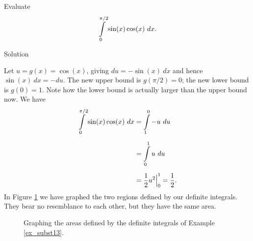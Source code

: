 \begin{example}\label{ex_subst13}
Evaluate
$$ \displaystyle\int\limits_0^{\pi/2} \sin(x) \cos(x)\ dx.$$

Solution 

Let $u = g(x) = \cos(x)$, giving $du = -\sin(x)\ dx$ and hence $\sin(x)\ dx = -du$. The new upper bound is $g(\pi/2) = 0$; the new lower bound is $g(0) = 1$. Note how the lower bound is actually larger than the upper bound now. We have
\begin{align*}
\ds\int\limits_0^{\pi/2} \sin(x)\cos(x)\ dx &= \ds\int\limits_1^0 -u\ du \\[0.2cm] %
											&=	\ds\int\limits_0^1 u\ du\\[0.2cm]
											&= \frac12u^2\Big|_0^1= \dfrac{1}{2}.%
\end{align*}
In Figure \ref{fig_int_11} we have graphed the two regions defined by our definite integrals. They bear no resemblance to each other, but they have the same area.


\begin{figure}[H]
\centering
\qquad
{}
\caption{Graphing the areas defined by the definite integrals of Example \ref{ex_subst13}.}
\label{fig_int_11}
\end{figure} 

\end{example}



